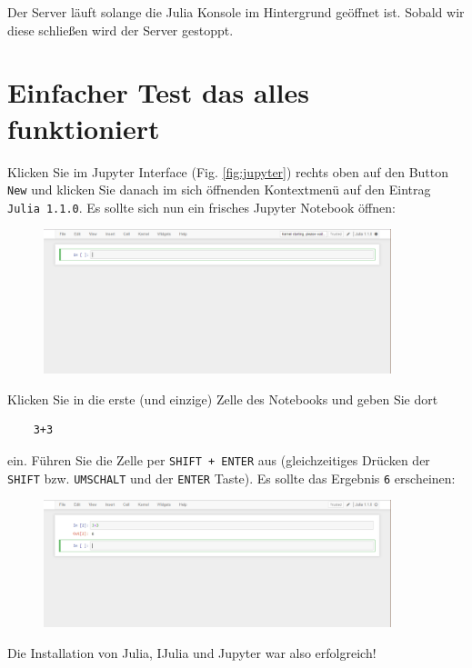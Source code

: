 \documentclass[11pt, a4paper]{scrartcl}
\begin{document}
	Der Server läuft solange die Julia Konsole im Hintergrund geöffnet ist. Sobald wir diese schließen wird der Server gestoppt.
	
	\newpage
	\section{Einfacher Test das alles funktioniert}
	
	Klicken Sie im Jupyter Interface (Fig. \ref{fig:jupyter}) rechts oben auf den Button \texttt{New} und klicken Sie danach im sich öffnenden Kontextmenü auf den Eintrag \texttt{Julia 1.1.0}. Es sollte sich nun ein frisches Jupyter Notebook öffnen:
	
	\begin{figure}[h!]
	\centering
	\includegraphics[width=0.9\textwidth]{imgs/jupyter_notebook.png}
	\end{figure}

	Klicken Sie in die erste (und einzige) Zelle des Notebooks und geben Sie dort
	
	\begin{lstlisting}
	3+3
	\end{lstlisting}
	ein. Führen Sie die Zelle per \texttt{SHIFT + ENTER} aus (gleichzeitiges Drücken der \texttt{SHIFT} bzw. \texttt{UMSCHALT} und der \texttt{ENTER} Taste). Es sollte das Ergebnis \texttt{6} erscheinen:

	\begin{figure}[h!]
	\centering
	\includegraphics[width=0.9\textwidth]{imgs/jupyter_notebook_test.png}
	\end{figure}	

	Die Installation von Julia, IJulia und Jupyter war also erfolgreich!
	
\end{document}
